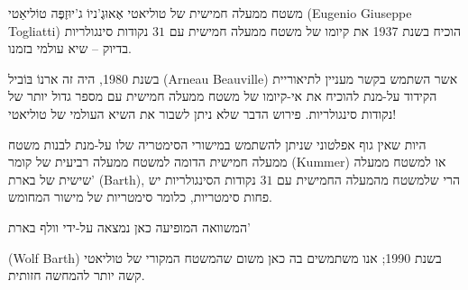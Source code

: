 \begin{surferPage}{%
משטח ממעלה חמישית של טוליאטי%
}
    אֶאוּגֶ'ניוֹ ג'יוּזֶפֶּה טוֹליאַטי
     \textenglish{(Eugenio Giuseppe Togliatti)}
      הוכיח בשנת 1937 את קיומו של משטח ממעלה חמישית עם $31$ נקודות סינגולריות בדיוק – שיא עולמי בזמנו.


    בשנת 1980, היה זה ארנוֹ בּוֹביל
   \textenglish{(Arneau Beauville)} אשר השתמש בקשר מעניין לתיאוריית
    הקידוד על-מנת להוכיח את אי-קיומו של משטח ממעלה חמישית עם מספר גדול יותר של
    נקודות סינגולריות.
    פירוש הדבר שלא ניתן לשבור את השיא העולמי של טוליאטי!

    היות שאין גוף אפלטוני שניתן להשתמש במישורי הסימטריה שלו על-מנת
    לבנות משטח ממעלה חמישית הדומה למשטח ממעלה רביעית של קומר (Kummer)
    או למשטח ממעלה שישית של בארת'
     \textenglish{(Barth)}, הרי שלמשטח מהמעלה החמישית עם $31$ נקודות הסינגולריות יש פחות סימטריות,
    כלומר סימטריות של מישור המחומש.

 המשוואה המופיעה כאן נמצאה על-ידי וולף בארת'

  \textenglish{(Wolf Barth)}
   בשנת 1990; אנו משתמשים בה כאן
משום שהמשטח המקורי של טוליאטי קשה יותר להמחשה חזותית.
\end{surferPage}
